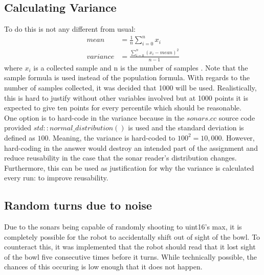 \documentclass{article}
\newcommand\tab[1][1cm]{\hspace*{#1}}
\begin{document}
\subsection{Calculating Variance}
To do this is not any different from usual:
\begin{equation}
    \begin{split}
        mean & = \frac{1}{n} \sum_{i=0}^n{x_i} \\
        variance & = \frac{\sum_{i=0}^n{(x_i - mean)^2}}{n-1}
    \end{split}
\end{equation}
where $x_i$ is a collected sample and n is the number of samples
\cite{variance}. Note that the sample formula is used instead of the population
formula. With regards to the number of samples collected, it was decided that
1000 will be used. Realistically, this is hard to justify without other
variables involved but at 1000 points it is expected to give ten points for
every percentile which should be reasonable.  
\\ \tab One option is to hard-code in the variance because in the $sonars.cc$ 
source code provided $std::normal\_distribution()$ is used and the standard
deviation is defined as $100$. Meaning, the variance is hard-coded to $100^2 =
10,000$. However, hard-coding in the answer would destroy an intended part of
the assignment and reduce reusability in the case that the sonar reader's
distribution changes. Furthermore, this can be used as justification for why the
variance is calculated every run: to improve reusability.
\subsection{Random turns due to noise}
Due to the sonars being capable of randomly shooting to uint16's max, it is completely
possible for the robot to accidentally shift out of sight of the bowl. To
counteract this, it was implemented that the robot should read that it lost
sight of the bowl five consecutive times before it turns. While technically
possible, the chances of this occuring is low enough that it does not happen.
\end{document}
